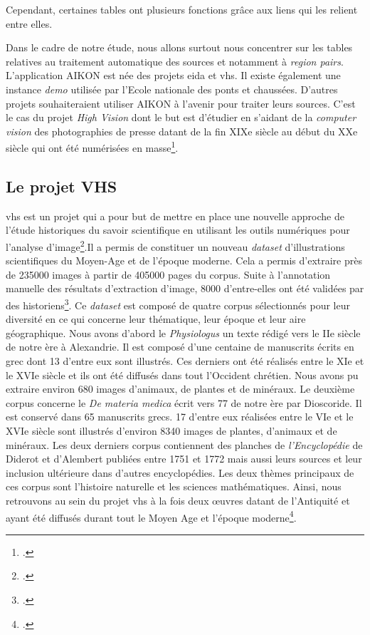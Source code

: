 Cependant, certaines tables ont plusieurs fonctions grâce aux liens qui les relient entre elles. 

Dans le cadre de notre étude, nous allons surtout nous concentrer sur les tables relatives au traitement automatique des sources et notamment à \textit{region pairs}. \\

L'application AIKON est née des projets \gls{eida} et \gls{vhs}. Il existe également une instance \textit{demo} utilisée par l'Ecole nationale des ponts et chaussées.
D'autres projets souhaiteraient utiliser AIKON à l'avenir pour traiter leurs sources. C'est le cas du projet \textit{High Vision} dont le but est d'étudier en s'aidant de la \textit{computer vision} des photographies de presse datant de la fin XIXe siècle au début du XXe siècle qui ont été numérisées en masse\footcite{HIGHVISIONProjet2025}.


\subsection{Le projet VHS}

\gls{vhs} est un projet qui a pour but de mettre en place une nouvelle approche de l'étude historiques du savoir scientifique en utilisant les outils numériques pour l'analyse d'image\footcite{Presentation}.Il a permis de constituer un nouveau \textit{dataset} d'illustrations scientifiques du Moyen-Age et de l'époque moderne. Cela a permis d'extraire près de 235000 images à partir de 405000 pages du corpus. Suite à l'annotation manuelle des résultats d'extraction d'image, 8000 d'entre-elles ont été validées par des historiens\footcite{fouadComputerVisionHistorical2023}. Ce \textit{dataset} est composé de quatre corpus sélectionnés pour leur diversité en ce qui concerne leur thématique, leur époque et leur aire géographique. 
Nous avons d'abord le \textit{Physiologus} un texte rédigé vers le IIe siècle de notre ère à Alexandrie. Il est composé d'une centaine de manuscrits écrits en grec dont 13 d'entre eux sont illustrés. Ces derniers ont été réalisés entre le XIe et le XVIe siècle et ils ont été diffusés dans tout l'Occident chrétien. Nous avons pu extraire environ 680 images d'animaux, de plantes et de minéraux. 
Le deuxième corpus concerne le \textit{De materia medica} écrit vers 77 de notre ère par Dioscoride. Il est conservé dans 65 manuscrits grecs. 17 d'entre eux réalisées entre le VIe et le XVIe siècle sont illustrés d'environ 8340 images de plantes, d'animaux et de minéraux. 
Les deux derniers corpus contiennent des planches de \textit{l'Encyclopédie} de Diderot et d'Alembert publiées entre 1751 et 1772 mais aussi leurs sources et leur inclusion ultérieure dans d'autres encyclopédies. Les deux thèmes principaux de ces corpus sont l'histoire naturelle et les sciences mathématiques. 
Ainsi, nous retrouvons au sein du projet \gls{vhs} à la fois deux œuvres datant de l'Antiquité et ayant été diffusés durant tout le Moyen Age et l'époque moderne\footcite{Corpus}.



